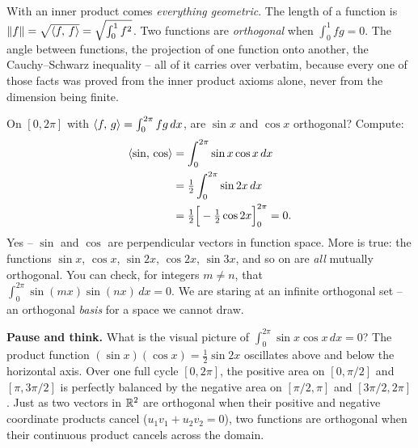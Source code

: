 With an inner product comes \emph{everything geometric}. The length of a function
is $\lVert f\rVert = \sqrt{\langle f,\, f \rangle} = \sqrt{\int_0^1 f^2}$. Two functions are
\emph{orthogonal} when $\int_0^1 fg = 0$. The angle between functions, the
projection of one function onto another, the Cauchy--Schwarz inequality -- all of it
carries over verbatim, because every one of those facts was proved from the inner
product axioms alone, never from the dimension being finite.

\begin{example}
\label{ch37:ex-orthfun}
On $[0,2\pi]$ with $\langle f,\, g \rangle=\int_0^{2\pi} fg\,dx$, are $\sin x$ and $\cos x$
orthogonal? Compute:
\begin{align*}
  \langle \sin,\, \cos \rangle &= \int_0^{2\pi}\sin x\cos x\,dx\\
  &= \tfrac12\int_0^{2\pi}\sin 2x\,dx\\
  &= \tfrac12\Big[-\tfrac12\cos 2x\Big]_0^{2\pi} = 0.
\end{align*}
Yes -- $\sin$ and $\cos$ are perpendicular vectors in function space. More is true:
the functions $\sin x$, $\cos x$, $\sin 2x$, $\cos 2x$, $\sin 3x$, and so on are
\emph{all} mutually orthogonal. You can check, for integers $m\neq n$, that $\int_0^{2\pi}\sin(mx)\sin(nx)\,dx=0$.
We are staring at an infinite orthogonal set -- an orthogonal \emph{basis} for a
space we cannot draw.
\end{example}

\begin{recoverybox}
\textbf{Pause and think.} What is the visual picture of $\int_0^{2\pi}\sin x\cos x\,dx = 0$? The product function $(\sin x)(\cos x) = \frac{1}{2}\sin 2x$ oscillates above and below the horizontal axis. Over one full cycle $[0,2\pi]$, the positive area on $[0,\pi/2]$ and $[\pi, 3\pi/2]$ is perfectly balanced by the negative area on $[\pi/2, \pi]$ and $[3\pi/2, 2\pi]$. Just as two vectors in $\mathbb{R}^2$ are orthogonal when their positive and negative coordinate products cancel ($u_1 v_1 + u_2 v_2 = 0$), two functions are orthogonal when their continuous product cancels across the domain.
\end{recoverybox}

